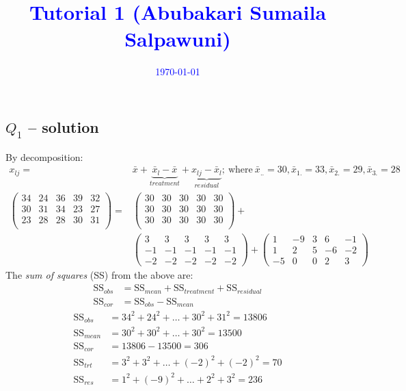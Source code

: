 \documentclass[12pt,a4paper, fleq]{article}
\begin{document}
\title{\textcolor{blue}{Tutorial 1 (Abubakari Sumaila Salpawuni)}}\vskip -3mm

\date{\textcolor{blue}{\today}}
\maketitle

\subsection*{$Q_{1}$ -- solution}
By decomposition:
\[
\begin{split}
x_{lj} = &\bar{x} +\underbrace{\bar{x}_l - \bar{x}}_{treatment} +\underbrace{ x_{lj} - \bar{x}_l}_{residual};\: \mbox{where}\: \bar{x}_{..} = 30, \bar{x}_{1.} = 33,\bar{x}_{2.} = 29,\bar{x}_{3.} = 28\\[1mm]
\begin{pmatrix}
34&24&36&39&32\\
30&31&34&23&27\\
23&28&28&30&31\\
\end{pmatrix}
= 
&\begin{pmatrix}
30&30&30&30&30\\
30&30&30&30&30\\
30&30&30&30&30\\
\end{pmatrix}
+\\[2mm]
&\begin{pmatrix}
3&3&3&3&3\\
-1&-1&-1&-1&-1\\
-2&-2&-2&-2&-2
\end{pmatrix}
+
\begin{pmatrix}
1&-9&3&6&-1\\
1&2&5&-6&-2\\
-5&0&0&2&3
\end{pmatrix}
\end{split}
\]
The {\it sum of squares} (SS) from the above are:
\[
\begin{split}
\mbox{SS}_{obs} &= \mbox{SS}_{mean} + \mbox{SS}_{treatment} + \mbox{SS}_{residual}\\
 \mbox{SS}_{cor} &  = \mbox{SS}_{obs} -  \mbox{SS}_{mean}
\end{split}
\]
\[
\begin{split}
\mbox{SS}_{obs} &= 34^2 + 24^2 + \ldots + 30^2 + 31^2 = 13806\\
\mbox{SS}_{mean} &= 30^2 + 30^2 + \ldots + 30^2 = 13500\\
\mbox{SS}_{cor} &= 13806 - 13500 = 306\\
\mbox{SS}_{trt} &= 3^2 + 3^2 + \ldots + (-2)^2 + (-2)^2 = 70\\
\mbox{SS}_{res} &= 1^2 + (-9)^2 + \ldots + 2^2 + 3^2 = 236
\end{split}
\]
\end{document}
